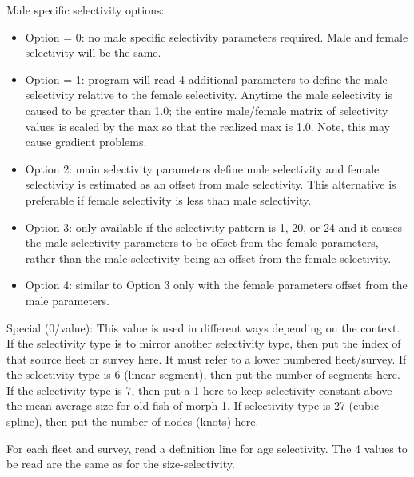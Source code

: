 Male specific selectivity options:
\begin{itemize}
	\item Option = 0: no male specific selectivity parameters required. Male and female selectivity will be the same.
	\item Option = 1: program will read 4 additional parameters to define the male selectivity relative to the female selectivity. Anytime the male selectivity is caused to be greater than 1.0; the entire male/female matrix of selectivity values is scaled by the max so that the realized max is 1.0. Note, this may cause gradient problems.  
	\item Option 2: main selectivity parameters define male selectivity and female selectivity is estimated as an offset from male selectivity.  This alternative is preferable if female selectivity is less than male selectivity.  
	\item Option 3: only available if the selectivity pattern is 1, 20, or 24 and it causes the male selectivity parameters to be offset from the female parameters, rather than the male selectivity being an offset from the female selectivity.
	\item Option 4: similar to Option 3 only with the female parameters offset from the male parameters.
\end{itemize}

Special (0/value): This value is used in different ways depending on the context.  If the selectivity type is to mirror another selectivity type, then put the index of that source fleet or survey here. It must refer to a lower numbered fleet/survey. If the selectivity type is 6 (linear segment), then put the number of segments here. If the selectivity type is 7, then put a 1 here to keep selectivity constant above the mean average size for old fish of morph 1. If selectivity type is 27 (cubic spline), then put the number of nodes (knots) here.

For each fleet and survey, read a definition line for age selectivity. The 4 values to be read are the same as for the size-selectivity. 


